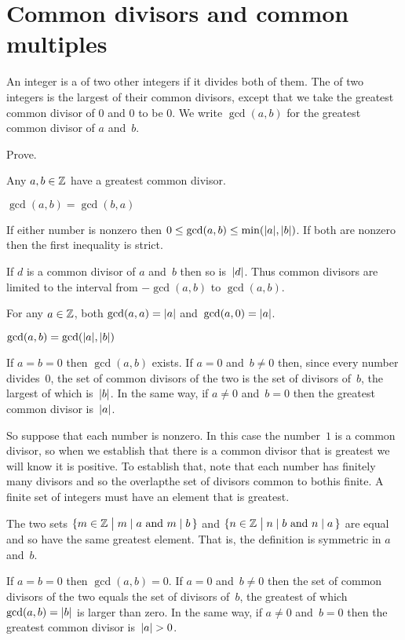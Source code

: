 \documentclass{ibl}
\begin{document}
\section{Common divisors and common multiples}

\begin{df}
An integer is a  of two other integers if it
divides both of them.
The  of two integers 
is the largest of their common divisors,
except that we take the greatest common divisor of $0$ and $0$ 
to be $0$.
We write $\gcd(a,b)$ for the greatest common divisor
of $a$ and~$b$.
\end{df}

\begin{ex}
Prove.
\begin{exes} 
\item {} Any $a,b\in\mathbb{Z}$ have a greatest common divisor.
\item {} $\gcd(a,b)=\gcd(b,a)$
\item If either number is nonzero then 
  $0\leq \gcd(a,b)\leq\min(\lvert a\rvert,\lvert b\rvert)$.
  If both are nonzero then the first
  inequality is strict.
\item If $d$ is a common divisor of $a$ and~$b$ then so is~$\lvert d\rvert$.
  Thus common divisors are limited to the interval from $-\gcd(a,b)$
  to $\gcd(a,b)$.
\item For any $a\in\mathbb{Z}$, both $\gcd(a,a)=\lvert a\rvert$ 
  and~$\gcd(a,0)=\lvert a\rvert$.
\item $\gcd(a,b)=\gcd(\lvert a\rvert,\lvert b\rvert)$
\end{exes} 
\begin{ans}
\begin{exes}
\item If $a=b=0$ then $\gcd(a,b)$ exists. 
  If $a=0$ and~$b\neq 0$ then, since every number divides~$0$, the set of 
  common divisors of the two is the set of divisors of~$b$, 
  the largest of which is~$\lvert b\rvert$.
  In the same way, if $a\neq 0$ and~$b=0$ then the greatest common divisor 
  is~$\lvert a\rvert$.

  So suppose that each number is nonzero.
  In this case the number~$1$ is a common divisor, so when we establish that 
  there is a common divisor that is greatest we will know it is positive.
  To establish that, note that each number has finitely many divisors and
  so the overlap\Dash the set of divisors common to both\Dash is finite.
  A finite set of integers must have an element that is greatest.
\item The two sets 
  $\{m\in\mathbb{Z} \bigm| \text{$m\mid a$ and $m\mid b$\,}\}$
  and 
  $\{n\in\mathbb{Z} \bigm| \text{$n\mid b$ and $n\mid a$\,}\}$
  are equal and so have the same greatest element. 
  That is, the definition is symmetric in $a$ and~$b$.
\item If $a=b=0$ then $\gcd(a,b)=0$. 
  If $a=0$ and~$b\neq 0$ then the set of 
  common divisors of the two equals the set of divisors of~$b$, 
  the greatest of which $\gcd(a,b)=\lvert b\rvert$ is larger than zero.
  In the same way, if $a\neq 0$ and~$b=0$ then the greatest common divisor 
  is~$\lvert a\rvert>0$.


\end{exes}
\end{ans}
\end{ex}
\end{document}
